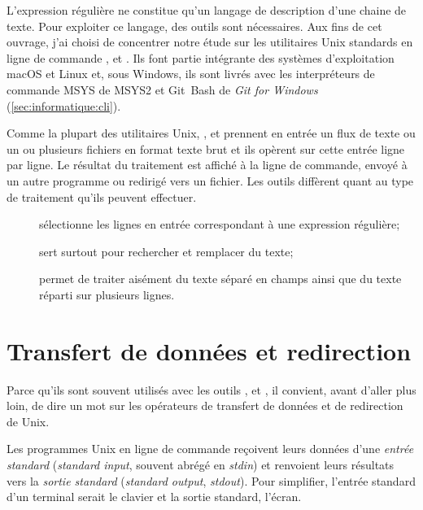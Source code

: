 L'expression régulière ne constitue qu'un langage de description d'une
chaine de texte. Pour exploiter ce langage, des outils sont
nécessaires. Aux fins de cet ouvrage, j'ai choisi de concentrer notre
étude sur les utilitaires Unix standards en ligne de commande
,  et . Ils font partie intégrante des
systèmes d'exploitation macOS et Linux et, sous Windows, ils sont
livrés avec les interpréteurs de commande MSYS de MSYS2
et Git~Bash de \emph{Git for Windows}
(\autoref{sec:informatique:cli}).

Comme la plupart des utilitaires Unix, ,  et
 prennent en entrée un flux de texte ou un ou plusieurs
fichiers en format texte brut et ils opèrent sur cette entrée ligne
par ligne. Le résultat du traitement est affiché à la ligne de
commande, envoyé à un autre programme ou redirigé vers un fichier. Les
outils diffèrent quant au type de traitement qu'ils peuvent effectuer.
\begin{description}
\item[] sélectionne les lignes en entrée correspondant à
  une expression régulière;
\item[] sert surtout pour rechercher et remplacer du texte;
\item[] permet de traiter aisément du texte séparé en champs
  ainsi que du texte réparti sur plusieurs lignes.
\end{description}



\section{Transfert de données et redirection}
\label{sec:texte:flux}

Parce qu'ils sont souvent utilisés avec les outils ,
 et , il convient, avant d'aller plus loin, de
dire un mot sur les opérateurs de transfert de données et de
redirection de Unix.

Les programmes Unix en ligne de commande reçoivent leurs données d'une
\emph{entrée standard} (\emph{standard
  input}, souvent abrégé en \emph{stdin}) et renvoient leurs résultats
vers la \emph{sortie standard} (\emph{standard output},
\emph{stdout}). Pour simplifier, l'entrée standard d'un terminal
serait le clavier et la sortie standard, l'écran.

